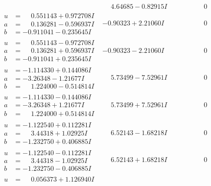 \documentclass[1p]{elsarticle_modified}
\theoremstyle{definition}
\begin{document}
$$\begin{array}{c|c|c}
 & \phantom{-}4.64685 - 0.82915 I & \phantom{-0.000000 } 0 \\ \hline\begin{aligned}
u &= \phantom{-}0.551143 + 0.972708 I \\
a &= \phantom{-}0.136281 - 0.596937 I \\
b &= -0.911041 - 0.235645 I\end{aligned}
 & -0.90323 + 2.21060 I & \phantom{-0.000000 } 0 \\ \hline\begin{aligned}
u &= \phantom{-}0.551143 - 0.972708 I \\
a &= \phantom{-}0.136281 + 0.596937 I \\
b &= -0.911041 + 0.235645 I\end{aligned}
 & -0.90323 - 2.21060 I & \phantom{-0.000000 } 0 \\ \hline\begin{aligned}
u &= -1.114330 + 0.144086 I \\
a &= -3.26348 - 1.21677 I \\
b &= \phantom{-}1.224000 - 0.514814 I\end{aligned}
 & \phantom{-}5.73499 - 7.52961 I & \phantom{-0.000000 } 0 \\ \hline\begin{aligned}
u &= -1.114330 - 0.144086 I \\
a &= -3.26348 + 1.21677 I \\
b &= \phantom{-}1.224000 + 0.514814 I\end{aligned}
 & \phantom{-}5.73499 + 7.52961 I & \phantom{-0.000000 } 0 \\ \hline\begin{aligned}
u &= -1.122540 + 0.112281 I \\
a &= \phantom{-}3.44318 + 1.02925 I \\
b &= -1.232750 + 0.406885 I\end{aligned}
 & \phantom{-}6.52143 - 1.68218 I & \phantom{-0.000000 } 0 \\ \hline\begin{aligned}
u &= -1.122540 - 0.112281 I \\
a &= \phantom{-}3.44318 - 1.02925 I \\
b &= -1.232750 - 0.406885 I\end{aligned}
 & \phantom{-}6.52143 + 1.68218 I & \phantom{-0.000000 } 0 \\ \hline\begin{aligned}
u &= \phantom{-}0.056373 + 1.126940 I \\

\end{aligned}
\end{array}$$
\end{document}
